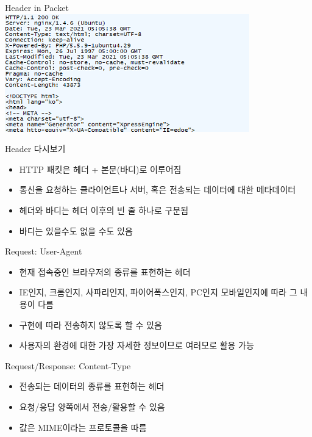 \documentclass{beamer}
\begin{document}
    \begin{frame}{Header in Packet}
        \includegraphics[width=\linewidth]{Images/response_http.png}
    \end{frame}

    \begin{frame}{Header 다시보기}
        \begin{itemize}
            \item HTTP 패킷은 헤더 + 본문(바디)로 이루어짐
            \item 통신을 요청하는 클라이언트나 서버, 혹은 전송되는 데이터에 대한 메타데이터
            \item 헤더와 바디는 헤더 이후의 빈 줄 하나로 구분됨
            \item 바디는 있을수도 없을 수도 있음
        \end{itemize}
    \end{frame}

    \begin{frame}{Request: User-Agent}
        \begin{itemize}
            \item 현재 접속중인 브라우저의 종류를 표현하는 헤더
            \item IE인지, 크롬인지, 사파리인지, 파이어폭스인지, PC인지 모바일인지에 따라 그 내용이 다름
            \item 구현에 따라 전송하지 않도록 할 수 있음
            \item 사용자의 환경에 대한 가장 자세한 정보이므로 여러모로 활용 가능
        \end{itemize}
    \end{frame}

    \begin{frame}{Request/Response: Content-Type}
        \begin{itemize}
            \item 전송되는 데이터의 종류를 표현하는 헤더
            \item 요청/응답 양쪽에서 전송/활용할 수 있음
            \item 값은 MIME이라는 프로토콜을 따름
        \end{itemize}
    \end{frame}
\end{document}

